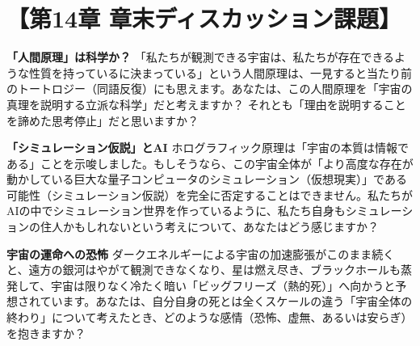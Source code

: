 \section*{【第14章 章末ディスカッション課題】}

\textbf{「人間原理」は科学か？} 「私たちが観測できる宇宙は、私たちが存在できるような性質を持っているに決まっている」という人間原理は、一見すると当たり前のトートロジー（同語反復）にも思えます。あなたは、この人間原理を「宇宙の真理を説明する立派な科学」だと考えますか？ それとも「理由を説明することを諦めた思考停止」だと思いますか？

\textbf{「シミュレーション仮説」とAI} ホログラフィック原理は「宇宙の本質は情報である」ことを示唆しました。もしそうなら、この宇宙全体が「より高度な存在が動かしている巨大な量子コンピュータのシミュレーション（仮想現実）」である可能性（シミュレーション仮説）を完全に否定することはできません。私たちがAIの中でシミュレーション世界を作っているように、私たち自身もシミュレーションの住人かもしれないという考えについて、あなたはどう感じますか？

\textbf{宇宙の運命への恐怖} ダークエネルギーによる宇宙の加速膨張がこのまま続くと、遠方の銀河はやがて観測できなくなり、星は燃え尽き、ブラックホールも蒸発して、宇宙は限りなく冷たく暗い「ビッグフリーズ（熱的死）」へ向かうと予想されています。あなたは、自分自身の死とは全くスケールの違う「宇宙全体の終わり」について考えたとき、どのような感情（恐怖、虚無、あるいは安らぎ）を抱きますか？




